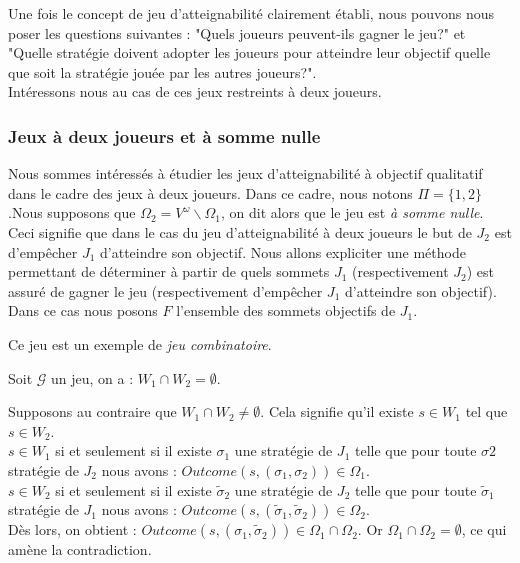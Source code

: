 	
	
	Une fois le concept de jeu d'atteignabilité clairement établi, nous pouvons nous poser les questions suivantes : "Quels joueurs peuvent-ils gagner le jeu?" et "Quelle stratégie doivent adopter les joueurs pour atteindre leur objectif quelle que soit la stratégie jouée par les autres joueurs?". \\
	
	Intéressons nous au cas de ces jeux restreints à deux joueurs.
	
	\subsubsection{Jeux à deux joueurs et à somme nulle}
	Nous sommes intéressés à étudier les jeux d'atteignabilité à objectif qualitatif dans le cadre des jeux à deux joueurs. Dans ce cadre, nous notons $\Pi = \{1,2\}$.Nous supposons que $\Omega _{2} = V^{\omega}\backslash \Omega _{1}$, on dit alors que le jeu est \textit{à somme nulle}. Ceci signifie que dans le cas du jeu d'atteignabilité à deux joueurs le but de $J_{2}$ est d'empêcher $J_{1}$ d'atteindre son objectif. Nous allons expliciter une méthode permettant de déterminer à partir de quels sommets $J_{1}$ (respectivement $J_{2}$) est assuré de gagner le jeu (respectivement d'empêcher $J_{1}$ d'atteindre son objectif). Dans ce cas nous posons $F$ l'ensemble des sommets objectifs de $J_{1}$.
	
	\begin{rem}
		Ce jeu est un exemple de \textit{jeu combinatoire}.
	\end{rem}

	\label{Wempty}
	\begin{propriete}
		Soit $\mathcal{G}$ un jeu, on a : $W_{1}\cap W_{2} = \emptyset$.
	\end{propriete}
	\begin{demonstration}
		Supposons au contraire que $W_{1}\cap W_{2} \neq \emptyset$. Cela signifie qu'il existe $s \in W_{1}$ tel que $s \in W_{2}$.\\
		$s \in W_{1}$ si et seulement si il existe $\sigma _{1}$ une stratégie de $J_{1}$ telle que pour toute $\sigma {2}$ stratégie de $J_{2}$ nous avons : $Outcome(s,(\sigma _{1},\sigma _{2})) \in \Omega _{1}$.\\
		$s \in W_{2}$ si et seulement si il existe $\tilde{\sigma} _{2}$ une stratégie de $J_{2}$ telle que pour toute $\tilde{\sigma}_{1}$ stratégie de $J_{1}$ nous avons : $Outcome(s,(\tilde{\sigma}_{1},\tilde{\sigma}_{2})) \in \Omega _{2}$.\\
		Dès lors, on obtient : $Outcome(s,(\sigma _{1},\tilde{\sigma}_{2})) \in \Omega _{1} \cap \Omega _{2}$. Or $\Omega _{1} \cap \Omega _{2} = \emptyset$, ce qui amène la contradiction.\\
	\end{demonstration}

